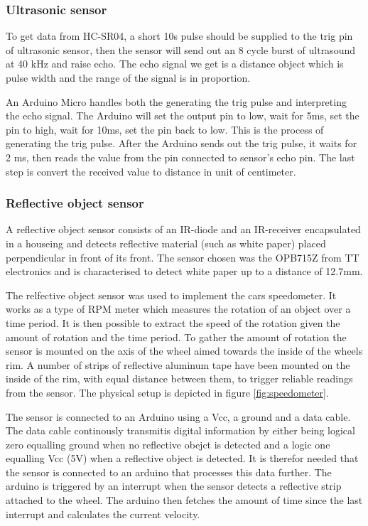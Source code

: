 \documentclass[11pt, titlepage]{article} %
\begin{document}
\subsubsection{Ultrasonic sensor}
To get data from HC-SR04, a short 10\textmu s pulse should be supplied to the trig pin of ultrasonic sensor, then the sensor will send out an 8 cycle burst of ultrasound at 40 kHz and raise echo. The echo signal we get is a distance object which is pulse width and the range of the signal is in proportion. 

An Arduino Micro handles both the generating the trig pulse and interpreting the echo signal. The Arduino will set the output pin to low, wait for 5ms, set the pin to high, wait for 10ms, set the pin back to low. This is the process of generating the trig pulse. After the Arduino sends out the trig pulse, it waits for 2 ms, then reads the value from the pin connected to sensor's echo pin. The last step is convert the received value to distance in unit of centimeter.


\subsubsection{Reflective object sensor}
A reflective object sensor consists of an IR-diode and an IR-receiver encapsulated in a houseing and detects reflective material (such as white paper) placed perpendicular in front of its front. The sensor chosen was the OPB715Z from TT electronics and is characterised to detect white paper up to a distance of 12.7mm.

The relfective object sensor was used to implement the cars speedometer. It works as a type of RPM meter which measures the rotation of an object over a time period. It is then possible to extract the speed of the rotation given the amount of rotation and the time period. To gather the amount of rotation the sensor is mounted on the axis of the wheel aimed towards the inside of the wheels rim. A number of strips of reflective aluminum tape have been mounted on the inside of the rim, with equal distance between them, to trigger reliable readings from the sensor. The physical setup is depicted in figure \ref{fig:speedometer}.

The sensor is connected to an Arduino using a Vcc, a ground and a data cable. The data cable continously transmitis digital information by either being logical zero equalling ground when no reflective obejct is detected and a logic one equalling Vcc (5V) when a reflective object is detected. It is therefor needed that the sensor is connected to an arduino that processes this data further. The arduino is triggered by an interrupt when the sensor detects a reflective strip attached to the wheel. The arduino then fetches the amount of time since the last interrupt and calculates the current velocity.
\end{document}
